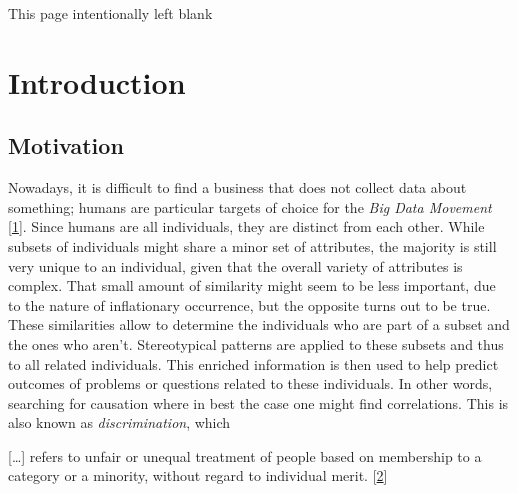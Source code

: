 \documentclass[12pt,english,a4paper,titlepage,cleardoublepage=empty,dottedtoc]{report}
\let\origquote\quote
\let\endorigquote\endquote
\renewenvironment{quote}{%
    \origquote
    \itshape
}
{\endorigquote}
\begin{document}
{
\setcounter{tocdepth}{1}
\pagestyle{plain}
\tableofcontents
}
\newpage
{}
\listoftables
\newpage
{}
\listoffigures
\newpage
\newpage

\begin{center}
\thispagestyle{empty}
\setcounter{page}{0}
This page intentionally left blank
\end{center}\newpage

\chapter{Introduction}\label{introduction}

\section{Motivation}\label{motivation}

Nowadays, it is difficult to find a business that does not collect data
about something; humans are particular targets of choice for the
\emph{Big Data Movement}
{[}\protect\hyperlink{ref-web_2016_privacy-international-about-big-data}{1}{]}.
Since humans are all individuals, they are distinct from each other.
While subsets of individuals might share a minor set of attributes, the
majority is still very unique to an individual, given that the overall
variety of attributes is complex. That small amount of similarity might
seem to be less important, due to the nature of inflationary occurrence,
but the opposite turns out to be true. These similarities allow to
determine the individuals who are part of a subset and the ones who
aren't. Stereotypical patterns are applied to these subsets and thus to
all related individuals. This enriched information is then used to help
predict outcomes of problems or questions related to these individuals.
In other words, searching for causation where in best the case one might
find correlations. This is also known as \emph{discrimination}, which

\begin{quote}
{[}\ldots{}{]} refers to unfair or unequal treatment of people based on
membership to a category or a minority, without regard to individual
merit.
{[}\protect\hyperlink{ref-paper_2008_discrimination-aware-data-mining}{2}{]}
\end{quote}
\end{document}
